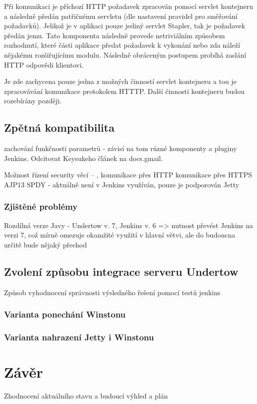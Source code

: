             Při komunikaci je příchozí HTTP požadavek zpracován pomocí servlet kontejneru 
            a následně předán patřičnému servletu (dle nastavení pravidel pro směřování požadavků).
            Jelikož je v aplikaci pouze jediný servlet Stapler, tak je požadavek předán jemu.
            Tato komponenta následně provede netriviálním způsobem rozhodnutí, které
            části aplikace předat požadavek k vykonání  nebo zda náleží nějakému rozšiřujícímu modulu.
            Následně obráceným postupem probíhá zaslání HTTP odpovědi klientovi.

            Je zde zachycena pouze jedna z možných činností
            servlet kontejneru a tou je zpracovávání komunikace protokolem HTTTP. 
            Další činnosti kontejneru budou rozebírány později.

 


    \section{Zpětná kompatibilita}
        zachování funkčnosti parametrů - závisí na tom různé komponenty a pluginy Jenkins. 
        Odcitovat Keysukeho článek na docs.gmail.  
        
        Možnost řízení security věcí -- \cite{securityArchitecture}, \cite{securityArchitectureWinstone}
        komunikace přes HTTP
        komunikace přes HTTPS
        AJP13     
        SPDY - aktuálně není v Jenkins využíván, pouze je podporován Jetty


        \subsection{Zjištěné problémy}
            Rozdílná verze Javy - Undertow v. 7, Jenkins v. 6 => nutnost převést Jenkins na verzi 7,
            což mírně omezuje okamžité využití v hlavní větvi, ale do budoucna určitě bude nějaký přechod


    \section{Zvolení způsobu integrace serveru Undertow}
        Způsob vyhodnocení správnosti výsledného řešení pomocí testů jenkins

        \subsection{Varianta ponechání Winstonu}

        \subsection{Varianta nahrazení Jetty i Winstonu}





\chapter{Závěr}
    Zhodnocení aktuálního stavu a budoucí výhled a plán





